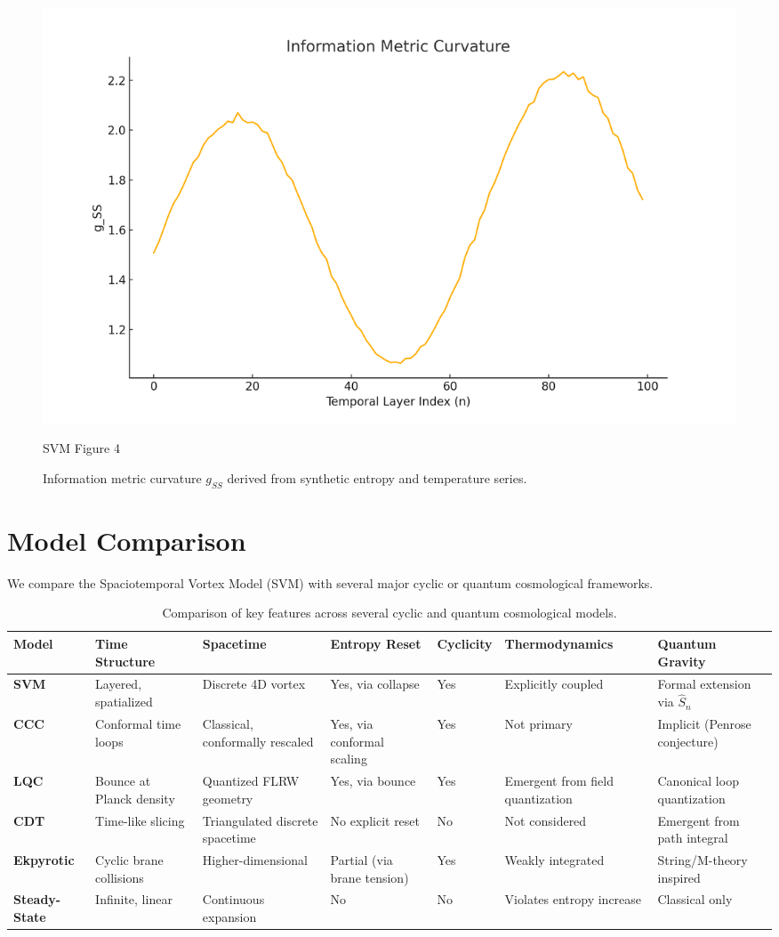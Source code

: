 \documentclass[11pt]{article}
\begin{document}
\begin{figure}[h!]
\centering
\centering
\includegraphics[width=0.9\linewidth]{05_Simulations/info_metric_curvature.png}
\caption{SVM Figure 4}
\label{fig:svm_4}
\caption{Information metric curvature $g_{SS}$ derived from synthetic entropy and temperature series.}
\end{figure}



\section{Model Comparison}

We compare the Spaciotemporal Vortex Model (SVM) with several major cyclic or quantum cosmological frameworks.

\begin{table}[htbp]
\centering
\footnotesize
\begin{tabularx}{\textwidth}{|l|X|X|X|X|X|X|}
\hline
\textbf{Model} & \textbf{Time Structure} & \textbf{Spacetime} & \textbf{Entropy Reset} & \textbf{Cyclicity} & \textbf{Thermodynamics} & \textbf{Quantum Gravity} \\
\hline
\textbf{SVM} & Layered, spatialized & Discrete 4D vortex & Yes, via collapse & Yes & Explicitly coupled & Formal extension via $\hat{S}_n$ \\
\textbf{CCC} & Conformal time loops & Classical, conformally rescaled & Yes, via conformal scaling & Yes & Not primary & Implicit (Penrose conjecture) \\
\textbf{LQC} & Bounce at Planck density & Quantized FLRW geometry & Yes, via bounce & Yes & Emergent from field quantization & Canonical loop quantization \\
\textbf{CDT} & Time-like slicing & Triangulated discrete spacetime & No explicit reset & No & Not considered & Emergent from path integral \\
\textbf{Ekpyrotic} & Cyclic brane collisions & Higher-dimensional & Partial (via brane tension) & Yes & Weakly integrated & String/M-theory inspired \\
\textbf{Steady-State} & Infinite, linear & Continuous expansion & No & No & Violates entropy increase & Classical only \\
\hline
\end{tabularx}
\caption{Comparison of key features across several cyclic and quantum cosmological models.}
\end{table}
\end{document}
